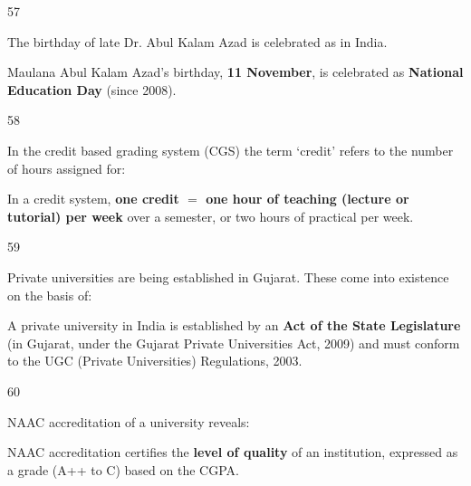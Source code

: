\begin{question}{57}
{The birthday of late Dr. Abul Kalam Azad is celebrated as \blank{} in India.\par}
\begin{explain}
Maulana Abul Kalam Azad's birthday, \textbf{11 November}, is celebrated as \textbf{National Education Day} (since 2008).
\end{explain}
\end{question}

\begin{question}{58}
{In the credit based grading system (CGS) the term `credit' refers to the number of hours assigned for:\par}
\begin{explain}
In a credit system, \textbf{one credit $=$ one hour of teaching (lecture or tutorial) per week} over a semester, or two hours of practical per week.
\end{explain}
\end{question}

\begin{question}{59}
{Private universities are being established in Gujarat. These come into existence on the basis of:\par}
\begin{explain}
A private university in India is established by an \textbf{Act of the State Legislature} (in Gujarat, under the Gujarat Private Universities Act, 2009) and must conform to the UGC (Private Universities) Regulations, 2003.
\end{explain}
\end{question}

\begin{question}{60}
{NAAC accreditation of a university reveals:\par}
\begin{explain}
NAAC accreditation certifies the \textbf{level of quality} of an institution, expressed as a grade (A++ to C) based on the CGPA.
\end{explain}
\end{question}
